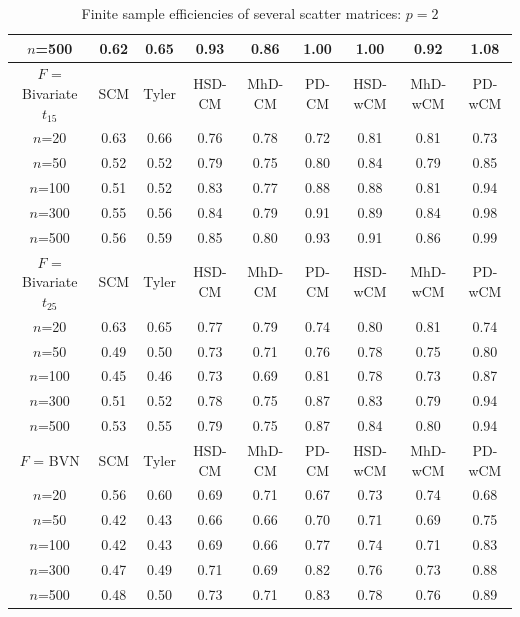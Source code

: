 \documentclass[fleqn,11pt]{article}
\begin{document}
\begin{table}
\begin{footnotesize}
\begin{tabular}{c|cc|ccc|ccc}
    $n$=500                  & 0.62 & 0.65  & 0.93   & 0.86   & 1.00  & 1.00    & 0.92    & 1.08   \\ \hline
    $F$ = Bivariate $t_{15}$ & SCM  & Tyler & HSD-CM & MhD-CM & PD-CM & HSD-wCM & MhD-wCM & PD-wCM \\ \hline
    $n$=20                   & 0.63 & 0.66  & 0.76   & 0.78   & 0.72  & 0.81    & 0.81    & 0.73   \\
    $n$=50                   & 0.52 & 0.52  & 0.79   & 0.75   & 0.80  & 0.84    & 0.79    & 0.85   \\
    $n$=100                  & 0.51 & 0.52  & 0.83   & 0.77   & 0.88  & 0.88    & 0.81    & 0.94   \\
    $n$=300                  & 0.55 & 0.56  & 0.84   & 0.79   & 0.91  & 0.89    & 0.84    & 0.98   \\
    $n$=500                  & 0.56 & 0.59  & 0.85   & 0.80   & 0.93  & 0.91    & 0.86    & 0.99   \\ \hline
    $F$ = Bivariate $t_{25}$ & SCM  & Tyler & HSD-CM & MhD-CM & PD-CM & HSD-wCM & MhD-wCM & PD-wCM \\ \hline
    $n$=20                   & 0.63 & 0.65  & 0.77   & 0.79   & 0.74  & 0.80    & 0.81    & 0.74   \\
    $n$=50                   & 0.49 & 0.50  & 0.73   & 0.71   & 0.76  & 0.78    & 0.75    & 0.80   \\
    $n$=100                  & 0.45 & 0.46  & 0.73   & 0.69   & 0.81  & 0.78    & 0.73    & 0.87   \\
    $n$=300                  & 0.51 & 0.52  & 0.78   & 0.75   & 0.87  & 0.83    & 0.79    & 0.94   \\
    $n$=500                  & 0.53 & 0.55  & 0.79   & 0.75   & 0.87  & 0.84    & 0.80    & 0.94   \\ \hline
    $F$ = BVN                & SCM  & Tyler & HSD-CM & MhD-CM & PD-CM & HSD-wCM & MhD-wCM & PD-wCM \\ \hline
    $n$=20                   & 0.56 & 0.60  & 0.69   & 0.71   & 0.67  & 0.73    & 0.74    & 0.68   \\
    $n$=50                   & 0.42 & 0.43  & 0.66   & 0.66   & 0.70  & 0.71    & 0.69    & 0.75   \\
    $n$=100                  & 0.42 & 0.43  & 0.69   & 0.66   & 0.77  & 0.74    & 0.71    & 0.83   \\
    $n$=300                  & 0.47 & 0.49  & 0.71   & 0.69   & 0.82  & 0.76    & 0.73    & 0.88   \\
    $n$=500                  & 0.48 & 0.50  & 0.73   & 0.71   & 0.83  & 0.78    & 0.76    & 0.89   \\ \hline
    \end{tabular}
\end{footnotesize}
\caption{Finite sample efficiencies of several scatter matrices: $p=2$}
\label{table:FSEtable2}
\end{table}
\end{document}
